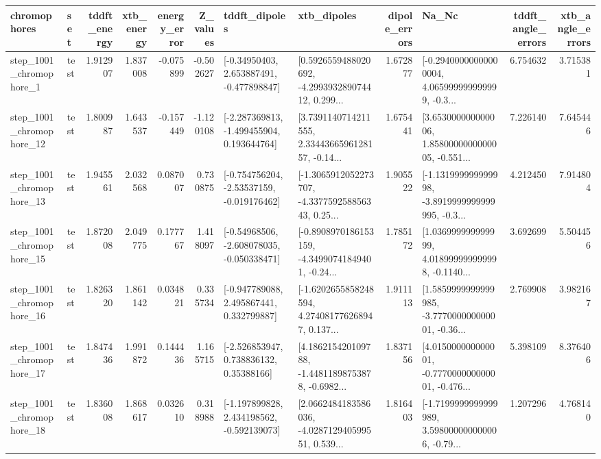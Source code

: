 \begin{tabular}{llrrrrllrlrr}
\toprule
             chromophores &       set &  tddft\_energy &  xtb\_energy &  energy\_error &  Z\_values &                               tddft\_dipoles &                                        xtb\_dipoles &  dipole\_errors &                                              Na\_Nc &  tddft\_angle\_errors &  xtb\_angle\_errors \\
\midrule
  step\_1001\_chromophore\_1 &      test &      1.912907 &    1.837008 &     -0.075899 & -0.502627 &    [-0.34950403, 2.653887491, -0.477898847] &  [0.5926559488020692, -4.299393289074412, 0.299... &       1.672877 &  [-0.29400000000000004, 4.065999999999999, -0.3... &            6.754632 &          3.715381 \\
 step\_1001\_chromophore\_12 &      test &      1.800987 &    1.643537 &     -0.157449 & -1.120108 &   [-2.287369813, -1.499455904, 0.193644764] &  [3.7391140714211555, 2.3344366596128157, -0.14... &       1.675441 &  [3.653000000000006, 1.8580000000000005, -0.551... &            7.226140 &          7.645446 \\
 step\_1001\_chromophore\_13 &      test &      1.945561 &    2.032568 &      0.087007 &  0.730875 &   [-0.754756204, -2.53537159, -0.019176462] &  [-1.3065912052273707, -4.337759258856343, 0.25... &       1.905522 &  [-1.131999999999998, -3.8919999999999995, -0.3... &            4.212450 &          7.914804 \\
 step\_1001\_chromophore\_15 &      test &      1.872008 &    2.049775 &      0.177767 &  1.418097 &   [-0.54968506, -2.608078035, -0.050338471] &  [-0.8908970186153159, -4.34990741849401, -0.24... &       1.785172 &  [1.036999999999999, 4.018999999999998, -0.1140... &            3.692699 &          5.504456 \\
 step\_1001\_chromophore\_16 &      test &      1.826320 &    1.861142 &      0.034821 &  0.335734 &    [-0.947789088, 2.495867441, 0.332799887] &  [-1.6202655858248594, 4.274081776268947, 0.137... &       1.911113 &  [1.5859999999999985, -3.777000000000001, -0.36... &            2.769908 &          3.982167 \\
 step\_1001\_chromophore\_17 &      test &      1.847436 &    1.991872 &      0.144436 &  1.165715 &     [-2.526853947, 0.738836132, 0.35388166] &  [4.186215420109788, -1.44811898753878, -0.6982... &       1.837156 &  [4.015000000000001, -0.777000000000001, -0.476... &            5.398109 &          8.376406 \\
 step\_1001\_chromophore\_18 &      test &      1.836008 &    1.868617 &      0.032610 &  0.318988 &   [-1.197899828, 2.434198562, -0.592139073] &  [2.0662484183586036, -4.028712940599551, 0.539... &       1.816403 &  [-1.7199999999999989, 3.598000000000006, -0.79... &            1.207296 &          4.768140 \\

\end{tabular}
